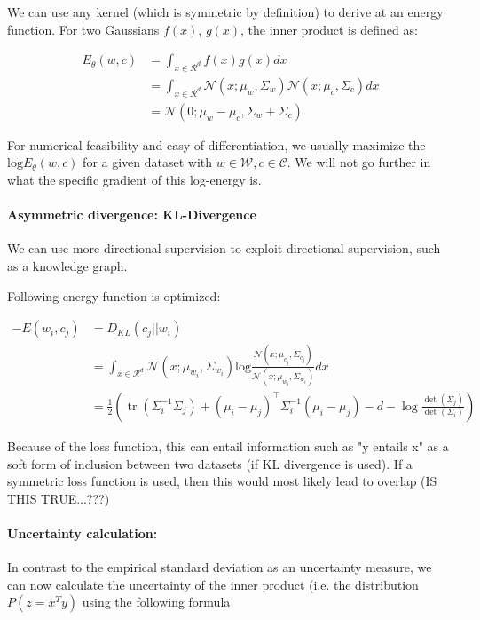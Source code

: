 \documentclass[a4paper,12pt,twoside,openright]{report}
\begin{document}
We can use any kernel (which is symmetric by definition) to derive at an energy function.
For two Gaussians $f(x)$, $g(x)$, the inner product is defined as:

\begin{align}
E_\theta(w, c) &= \int_{x \in \mathcal{R}^d} f(x)g(x) dx \\
&= \int_{x \in \mathcal{R}^d} \mathcal{N}(x; \mu_w, \Sigma_w) \mathcal{N}(x; \mu_c, \Sigma_c) dx \\
&= \mathcal{N}(0; \mu_w - \mu_c, \Sigma_w + \Sigma_c)
\end{align}

For numerical feasibility and easy of differentiation, we usually maximize the $\text{log} E_\theta(w, c)$ for a given dataset with $w \in \mathcal{W}, c \in \mathcal{C}$.
We will not go further in what the specific gradient of this log-energy is.

\paragraph{Asymmetric divergence: KL-Divergence}

We can use more directional supervision to exploit directional supervision, such as a knowledge graph.

Following energy-function is optimized:

\begin{align}
-E(w_i, c_j) & = D_{KL}(c_j || w_i) \\
&= \int_{x \in \mathcal{R}^d} \mathcal{N}(x; \mu_{w_i}, \Sigma_{w_i}) \text{log} \frac{\mathcal{N}(x; \mu_{c_j}, \Sigma_{c_j})}{\mathcal{N}(x; \mu_{w_i}, \Sigma_{w_i})} dx \\
&= \frac{1}{2}\left(\operatorname{tr}\left(\Sigma_{i}^{-1} \Sigma_{j}\right)+\left(\mu_{i}-\mu_{j}\right)^{\top} \Sigma_{i}^{-1}\left(\mu_{i}-\mu_{j}\right)-d-\log \frac{\operatorname{det}\left(\Sigma_{j}\right)}{\operatorname{det}\left(\Sigma_{i}\right)}\right)
\end{align}

Because of the loss function, this can entail information such as "y entails x" as a soft form of inclusion between two datasets (if KL divergence is used).
If a symmetric loss function is used, then this would most likely lead to overlap (IS THIS TRUE...???)

\paragraph{Uncertainty calculation:} In contrast to the empirical standard deviation as an uncertainty measure, we can now calculate the uncertainty of the inner product (i.e. the distribution $P(z=x^T y)$ using the following formula
\end{document}
